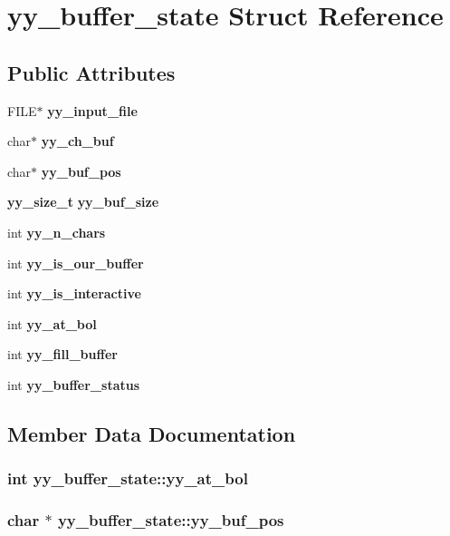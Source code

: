 \section{yy\_\-buffer\_\-state  Struct Reference}
\label{structyy__buffer__state}
\subsection*{Public Attributes}
\begin{CompactItemize}
\item 
FILE$\ast$ {\bf yy\_\-input\_\-file}
\item 
char$\ast$ {\bf yy\_\-ch\_\-buf}
\item 
char$\ast$ {\bf yy\_\-buf\_\-pos}
\item 
{\bf yy\_\-size\_\-t} {\bf yy\_\-buf\_\-size}
\item 
int {\bf yy\_\-n\_\-chars}
\item 
int {\bf yy\_\-is\_\-our\_\-buffer}
\item 
int {\bf yy\_\-is\_\-interactive}
\item 
int {\bf yy\_\-at\_\-bol}
\item 
int {\bf yy\_\-fill\_\-buffer}
\item 
int {\bf yy\_\-buffer\_\-status}
\end{CompactItemize}


\subsection{Member Data Documentation}
\subsubsection{\setlength{\rightskip}{0pt plus 5cm}int yy\_\-buffer\_\-state::yy\_\-at\_\-bol}\label{structyy__buffer__state_m7}


\subsubsection{\setlength{\rightskip}{0pt plus 5cm}char $\ast$ yy\_\-buffer\_\-state::yy\_\-buf\_\-pos}\label{structyy__buffer__state_m2}



